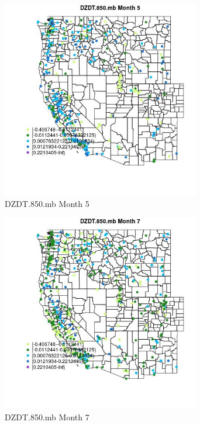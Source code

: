 \begin{figure} 
\centering  
\includegraphics[width=0.77\textwidth]{Code_Outputs/Report_ML_input_PM25_Step4_part_e_de_duplicated_aves_compiled_2019-05-18wNAs_MapObsMo5DZDT850mb.jpg} 
\caption{\label{fig:Report_ML_input_PM25_Step4_part_e_de_duplicated_aves_compiled_2019-05-18wNAsMapObsMo5DZDT850mb}DZDT.850.mb Month 5} 
\end{figure} 
 

\begin{figure} 
\centering  
\includegraphics[width=0.77\textwidth]{Code_Outputs/Report_ML_input_PM25_Step4_part_e_de_duplicated_aves_compiled_2019-05-18wNAs_MapObsMo7DZDT850mb.jpg} 
\caption{\label{fig:Report_ML_input_PM25_Step4_part_e_de_duplicated_aves_compiled_2019-05-18wNAsMapObsMo7DZDT850mb}DZDT.850.mb Month 7} 
\end{figure} 
 

